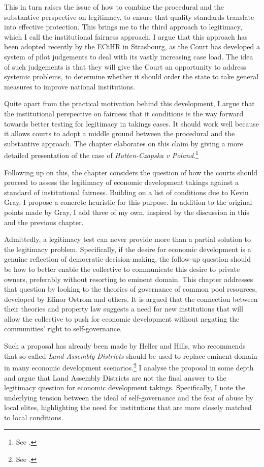 This in turn raises the issue of how to combine the procedural and the substantive perspective on legitimacy, to ensure that quality standards translate into effective protection. This brings me to the third approach to legitimacy, which I call the institutional fairness approach. I argue that this approach has been adopted recently by the ECtHR in Strasbourg, as the Court has developed a system of pilot judgements to deal with its vastly increasing case load. The idea of such judgements is that they will give the Court an opportunity to address systemic problems, to determine whether it should order the state to take general measures to improve national institutions.

Quite apart from the practical motivation behind this development, I argue that the institutional perspective on fairness that it conditions is the way forward towards better testing for legitimacy in takings cases. It should work well because it allows courts to adopt a middle ground between the procedural and the substantive approach. The chapter elaborates on this claim by giving a more detailed presentation of the case of {\it Hutten-Czapska v Poland}.\footnote{See \cite{hutten06}.}

Following up on this, the chapter considers the question of how the courts should proceed to assess the legitimacy of economic development takings against a standard of institutional fairness. Building on a list of conditions due to Kevin Gray, I propose a concrete heuristic for this purpose. In addition to the original points made by Gray, I add three of my own, inspired by the discussion in this and the previous chapter. 

Admittedly, a legitimacy test can never provide more than a partial solution to the legitimacy problem. Specifically, if the desire for economic development is a genuine reflection of democratic decision-making, the follow-up question should be how to better enable the collective to communicate this desire to private owners, preferably without resorting to eminent domain. This chapter addresses that question by looking to the theories of governance of common pool resources, developed by Elinor Ostrom and others. It is argued that the connection between their theories and property law suggests a need for new institutions that will allow the collective to push for economic development without negating the communities' right to self-governance. 

Such a proposal has already been made by Heller and Hills, who recommends that so-called {\it Land Assembly Districts} should be used to replace eminent domain in many economic development scenarios.\footnote{See \cite{heller08}.} I analyse the proposal in some depth and argue that Land Assembly Districts are not the final answer to the legitimacy question for economic development takings. Specifically, I note the underlying tension between the ideal of self-governance and the fear of abuse by local elites, highlighting the need for institutions that are more closely matched to local conditions.

